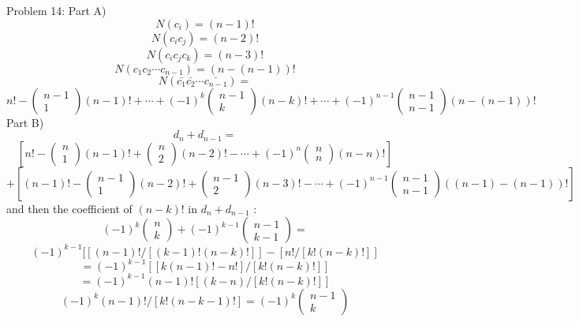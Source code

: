 \documentclass{article}
\begin{document}
Problem 14: Part A)
$$
N(c_i)=(n-1)!
$$
$$
N(c_ic_j)=(n-2)!
$$
$$
N(c_ic_jc_k)=(n-3)!
$$
$$
N(c_1c_2\cdots c_{n-1})=(n-(n-1))!
$$
$$
N(\bar{c_1}\bar{c_2}\cdots\bar{c_{n-1}})=
$$
$$
n!-
\left(\begin{array}{c}
n-1\\
1
\end{array}\right)
(n-1)!
+
\cdots
+
(-1)^k
\left(\begin{array}{c}
n-1\\
k
\end{array}\right)
(n-k)!
+
\cdots
+(-1)^{n-1}
\left(\begin{array}{c}
n-1\\
n-1
\end{array}\right)
(n-(n-1))!
$$
Part B)
$$
d_n+d_{n-1}=
$$
$$
\left[
n!-
\left(\begin{array}{c}
n\\
1
\end{array}\right)
(n-1)!
+
\left(\begin{array}{c}
n\\
2
\end{array}\right)
(n-2)!
-
\cdots
+
(-1)^n
\left(\begin{array}{c}
n\\
n
\end{array}\right)
(n-n)!
\right]
$$
$$
+
\left[
(n-1)!
-
\left(\begin{array}{c}
n-1\\
1
\end{array}\right)
(n-2)!
+
\left(\begin{array}{c}
n-1\\
2
\end{array}\right)
(n-3)!
-
\cdots
+
(-1)^{n-1}
\left(\begin{array}{c}
n-1\\
n-1
\end{array}\right)
((n-1)-(n-1))!
\right]
$$
and then the coefficient of $(n-k)!$ in $d_n+d_{n-1}$ :
$$
(-1)^k
\left(\begin{array}{c}
n\\
k
\end{array}\right)
+
(-1)^{k-1}
\left(\begin{array}{c}
n-1\\
k-1
\end{array}\right)
=
$$
$$
(-1)^{k-1}[[(n-1)!/[(k-1)!(n-k)!]]
-
[n!/[k!(n-k)!]]
$$
$$
=
(-1)^{k-1}
[[k(n-1)!-n!]/[k!(n-k)!]]
$$
$$
=
(-1)^{k-1}
(n-1)!
[(k-n)/[k!(n-k)!]]
$$
$$
(-1)^k(n-1)!/[k!(n-k-1)!]
=
(-1)^k
\left(\begin{array}{c}
n-1\\
k
\end{array}\right)
$$
\end{document}
